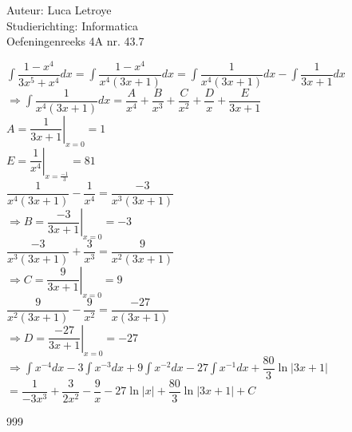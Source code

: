 \documentclass[a4paper]{article}
\newcommand{\dint}{\displaystyle\int}
\begin{document}
  
\noindent \large Auteur: Luca Letroye \\
\noindent \large Studierichting: Informatica\\
\noindent \large Oefeningenreeks 4A nr. 43.7

\medskip
\normalsize

$\dint\dfrac{1-x^4}{3x^5+x^4}dx = \dint\dfrac{1-x^4}{x^4(3x+1)}dx = \dint\dfrac{1}{x^4(3x+1)}dx - \dint\dfrac{1}{3x+1}dx $\\

$\Rightarrow  \dint\dfrac{1}{x^4(3x+1)}dx = \dfrac{A}{x^4}+\dfrac{B}{x^3} + \dfrac{C}{x^2} + \dfrac{D}{x} + \dfrac{E}{3x+1}$\\

$A = \left. \dfrac{1}{3x+1}\right|_{x=0} = 1$\\

$E = \left. \dfrac{1}{x^4}\right|_{x=\tfrac{-1}{3}} = 81$\\

$\dfrac{1}{x^4(3x+1)} - \dfrac{1}{x^4} = \dfrac{-3}{x^3(3x+1)}$\\

$\Rightarrow B = \left. \dfrac{-3}{3x+1}\right|_{x=0} = -3$\\

$\dfrac{-3}{x^3(3x+1)} + \dfrac{3}{x^3} = \dfrac{9}{x^2(3x+1)}$\\

$\Rightarrow C = \left. \dfrac{9}{3x+1}\right|_{x=0} = 9$\\

$\dfrac{9}{x^2(3x+1)} - \dfrac{9}{x^2} = \dfrac{-27}{x(3x+1)}$\\

$\Rightarrow D = \left. \dfrac{-27}{3x+1}\right|_{x=0} = -27$\\

$\Rightarrow \dint x^{-4}dx-3\dint x^{-3}dx +9\dint x^{-2}dx-27\dint x^{-1}dx + \dfrac{80}{3}\ln|3x+1|$\\

$ = \dfrac{1}{-3x^3}+\dfrac{3}{2x^2}-\dfrac{9}{x} - 27\ln|x| +\dfrac{80}{3}\ln|3x+1|+C$\\


\begin{thebibliography}{999}
\end{thebibliography}
\end{document}
